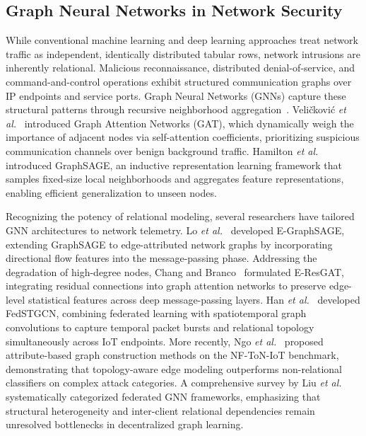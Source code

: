 \documentclass[journal,onecolumn]{IEEEtran}
\begin{document}
\subsection{Graph Neural Networks in Network Security}
While conventional machine learning and deep learning approaches treat network traffic as independent, identically distributed tabular rows, network intrusions are inherently relational. Malicious reconnaissance, distributed denial-of-service, and command-and-control operations exhibit structured communication graphs over IP endpoints and service ports. Graph Neural Networks (GNNs) capture these structural patterns through recursive neighborhood aggregation~\cite{velickovic2018gat, hamilton2017graphsage}. Veli\v{c}kovi\'{c} \emph{et al.}~\cite{velickovic2018gat} introduced Graph Attention Networks (GAT), which dynamically weigh the importance of adjacent nodes via self-attention coefficients, prioritizing suspicious communication channels over benign background traffic. Hamilton \emph{et al.}~\cite{hamilton2017graphsage} introduced GraphSAGE, an inductive representation learning framework that samples fixed-size local neighborhoods and aggregates feature representations, enabling efficient generalization to unseen nodes.

Recognizing the potency of relational modeling, several researchers have tailored GNN architectures to network telemetry. Lo \emph{et al.}~\cite{lo2022egraphsage} developed E-GraphSAGE, extending GraphSAGE to edge-attributed network graphs by incorporating directional flow features into the message-passing phase. Addressing the degradation of high-degree nodes, Chang and Branco~\cite{chang2021eresgat} formulated E-ResGAT, integrating residual connections into graph attention networks to preserve edge-level statistical features across deep message-passing layers. Han \emph{et al.}~\cite{han2025fedstgcn} developed FedSTGCN, combining federated learning with spatiotemporal graph convolutions to capture temporal packet bursts and relational topology simultaneously across IoT endpoints. More recently, Ngo \emph{et al.}~\cite{ngo2025tksgf} proposed attribute-based graph construction methods on the NF-ToN-IoT benchmark, demonstrating that topology-aware edge modeling outperforms non-relational classifiers on complex attack categories. A comprehensive survey by Liu \emph{et al.}~\cite{liu2024fedgnn} systematically categorized federated GNN frameworks, emphasizing that structural heterogeneity and inter-client relational dependencies remain unresolved bottlenecks in decentralized graph learning.
\end{document}
